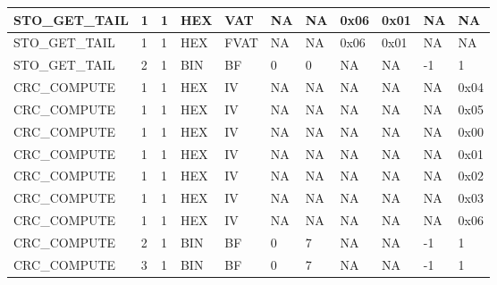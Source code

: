 {\begin{longtable}{|l|l|l|l|l|l|l|l|l|l|l|}
 \hline
STO\_GET\_TAIL & 1 & 1 & HEX & VAT & NA & NA & 0x06 & 0x01 & NA & NA \\
 \hline
STO\_GET\_TAIL & 1 & 1 & HEX & FVAT & NA & NA & 0x06 & 0x01 & NA & NA \\
 \hline
STO\_GET\_TAIL & 2 & 1 & BIN & BF & 0 & 0 & NA & NA & -1 & 1 \\
 \hline
CRC\_COMPUTE & 1 & 1 & HEX & IV & NA & NA & NA & NA & NA & 0x04 \\
 \hline
CRC\_COMPUTE & 1 & 1 & HEX & IV & NA & NA & NA & NA & NA & 0x05 \\
 \hline
CRC\_COMPUTE & 1 & 1 & HEX & IV & NA & NA & NA & NA & NA & 0x00 \\
 \hline
CRC\_COMPUTE & 1 & 1 & HEX & IV & NA & NA & NA & NA & NA & 0x01 \\
 \hline
CRC\_COMPUTE & 1 & 1 & HEX & IV & NA & NA & NA & NA & NA & 0x02 \\
 \hline
CRC\_COMPUTE & 1 & 1 & HEX & IV & NA & NA & NA & NA & NA & 0x03 \\
 \hline
CRC\_COMPUTE & 1 & 1 & HEX & IV & NA & NA & NA & NA & NA & 0x06 \\
 \hline
CRC\_COMPUTE & 2 & 1 & BIN & BF & 0 & 7 & NA & NA & -1 & 1 \\
 \hline
CRC\_COMPUTE & 3 & 1 & BIN & BF & 0 & 7 & NA & NA & -1 & 1 \\
\hline
\end{longtable}}
